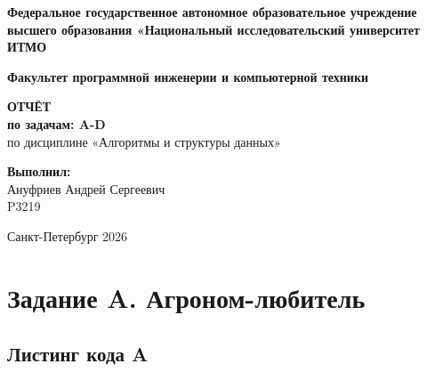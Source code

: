 \documentclass[a4paper,12pt]{article}
\begin{document}
    \begin{titlepage}
        \begin{center}
            \textbf{Федеральное государственное автономное образовательное учреждение высшего образования «Национальный исследовательский университет ИТМО} \\
            \vspace{1cm}

            \textbf{Факультет программной инженерии и компьютерной техники} \\
            \vspace{1cm}

            \Large{\textbf{ОТЧЁТ}} \\
            \Large{\textbf{по задачам: A-D}} \\
            \large{по дисциплине «Алгоритмы и структуры данных»} \\
            \vspace{2cm}
        \end{center}

        \begin{flushright}
            \textbf{Выполнил:} \\
            Ануфриев Андрей Сергеевич \\
            P3219 \\
        \end{flushright}

        \vfill
        \begin{center}
            Санкт-Петербург 2026
        \end{center}
    \end{titlepage}

    \tableofcontents
    \newpage



    \section{Задание A. Агроном-любитель}

    \subsection*{Листинг кода A}
    
\end{document}
